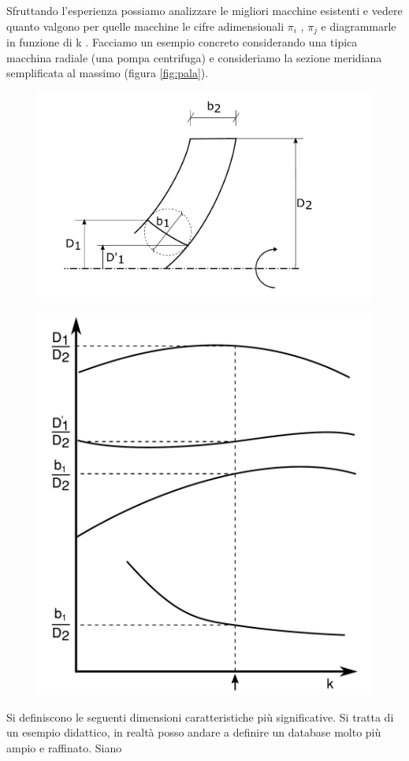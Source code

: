 Sfruttando l'esperienza possiamo analizzare le migliori macchine esistenti e vedere
quanto valgono per quelle macchine le cifre adimensionali $\pi_i$ , $\pi_j$ e diagrammarle in funzione di k . Facciamo un esempio concreto considerando una tipica macchina radiale (una pompa centrifuga) e consideriamo la sezione meridiana semplificata al massimo (figura \ref{fig:pala}).
\begin{figure}
\centering
\begin{minipage}{.5\textwidth}
  \centering
  \includegraphics[width=.9\linewidth]{fig/pala.pdf}
  \label{fig:pala}
\end{minipage}%
\begin{minipage}{.5\textwidth}
  \centering
  \includegraphics[width=.6\linewidth]{fig/primo_1.pdf}
  \label{fig:primo_1}
\end{minipage}
\end{figure}
Si definiscono le seguenti dimensioni caratteristiche più significative. Si tratta di un esempio didattico, in realtà posso andare a definire un database molto più ampio e raffinato. Siano
